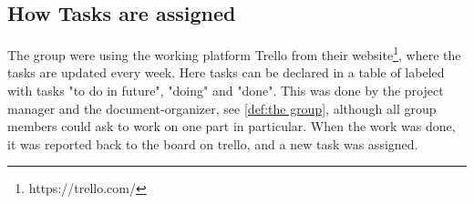 \subsection {How Tasks are assigned}
The group were using the working platform Trello from their website\footnote{https://trello.com/}, where the tasks are updated every week. Here tasks can be declared in a table of labeled with tasks "to do in future", "doing" and "done". This was done by the project manager and the document-organizer, see \ref{def:the group}, although all group members could ask to work on one part in particular. When the work was done, it was reported back to the board on trello, and a new task was assigned.  
